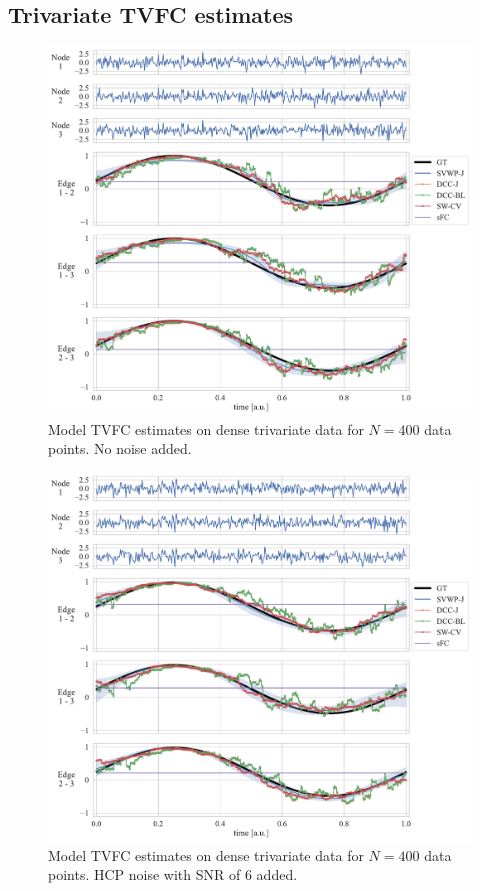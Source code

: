 \clearpage
\subsection{Trivariate TVFC estimates}\label{ch:appendix-d3d-impact-of-noise}


\begin{figure}[h]
    \centering
    \includegraphics[width=\textwidth]{fig/sim/d3d/N0400_T0003/no_noise/periodic_1_correlations}
    \caption{
        Model TVFC estimates on dense trivariate data for $N = 400$ data points.
        No noise added.
    }\label{fig:results-d3d-periodic-1-tvfc-predictions-no-noise}
\end{figure}


\begin{figure}[h]
    \centering
    \includegraphics[width=\textwidth]{fig/sim/d3d/N0400_T0003/HCP_noise_snr_6/periodic_1_correlations}
    \caption{
        Model TVFC estimates on dense trivariate data for $N = 400$ data points.
        HCP noise with SNR of 6 added.
    }\label{fig:results-d3d-periodic-1-tvfc-predictions-snr-6}
\end{figure}


